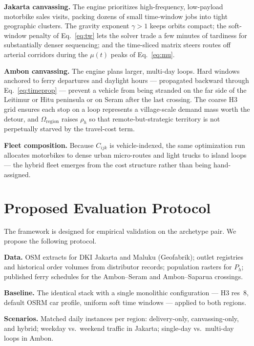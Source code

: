 \documentclass[11pt,a4paper,twocolumn]{article}
\begin{document}
\textbf{Jakarta canvassing.} The engine prioritizes high-frequency,
low-payload motorbike sales visits, packing dozens of small time-window
jobs into tight geographic clusters. The gravity exponent $\gamma > 1$
keeps orbits compact; the soft-window penalty of Eq.~\eqref{eq:tw} lets
the solver trade a few minutes of tardiness for substantially denser
sequencing; and the time-sliced matrix steers routes off arterial
corridors during the $\mu(t)$ peaks of Eq.~\eqref{eq:mu}.

\textbf{Ambon canvassing.} The engine plans larger, multi-day loops.
Hard windows anchored to ferry departures and daylight hours ---
propagated backward through Eq.~\eqref{eq:timeprop} --- prevent a vehicle
from being stranded on the far side of the Leitimur or Hitu peninsula or
on Seram after the last crossing. The coarse H3 grid ensures each stop on
a loop represents a village-scale demand mass worth the detour, and
$\Omega_{\mathrm{region}}$ raises $\rho_h$ so that remote-but-strategic
territory is not perpetually starved by the travel-cost term.

\textbf{Fleet composition.} Because $C_{ijk}$ is vehicle-indexed, the same
optimization run allocates motorbikes to dense urban micro-routes and
light trucks to island loops --- the hybrid fleet emerges from the cost
structure rather than being hand-assigned.

\section{Proposed Evaluation Protocol}
\label{sec:eval}

The framework is designed for empirical validation on the archetype pair.
We propose the following protocol.

\textbf{Data.} OSM extracts for DKI Jakarta and Maluku (Geofabrik);
outlet registries and historical order volumes from distributor records;
population rasters for $P_h$; published ferry schedules for the
Ambon--Seram and Ambon--Saparua crossings.

\textbf{Baseline.} The identical stack with a single monolithic
configuration --- H3 res~8, default OSRM car profile, uniform soft time
windows --- applied to both regions.

\textbf{Scenarios.} Matched daily instances per region: delivery-only,
canvassing-only, and hybrid; weekday vs.\ weekend traffic in Jakarta;
single-day vs.\ multi-day loops in Ambon.
\end{document}
